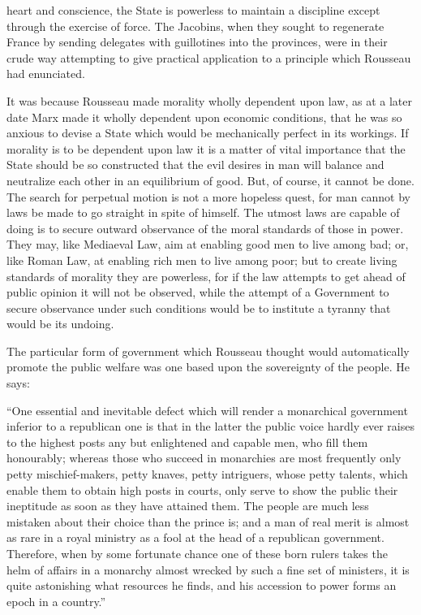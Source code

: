 \documentclass{book}
\begin{document}
heart and conscience, the State is powerless to maintain a discipline except through the exercise of force. The Jacobins, when they sought to regenerate France by sending delegates with guillotines into the provinces, were in their crude way attempting to give practical application to a principle which Rousseau had enunciated.

It was because Rousseau made morality wholly dependent upon law, as at a later date Marx made it wholly dependent upon economic conditions, that he was so anxious to devise a State which would be mechanically perfect in its workings. If morality is to be dependent upon law it is a matter of vital importance that the State should be so constructed that the evil desires in man will balance and neutralize each other in an equilibrium of good. But, of course, it cannot be done. The search for perpetual motion is not a more hopeless quest, for man cannot by laws be made to go straight in spite of himself. The utmost laws are capable of doing is to secure outward observance of the moral standards of those in power. They may, like Mediaeval Law, aim at enabling good men to live among bad; or, like Roman Law, at enabling rich men to live among poor; but to create living standards of morality they are powerless, for if the law attempts to get ahead of public opinion it will not be observed, while the attempt of a Government to secure observance under such conditions would be to institute a tyranny that would be its undoing.

The particular form of government which Rousseau thought would automatically promote the public welfare was one based upon the sovereignty of the people. He says:

“One essential and inevitable defect which will render a monarchical government inferior to a republican one is that in the latter the public voice hardly ever raises to the highest posts any but enlightened and capable men, who fill them honourably; whereas those who succeed in monarchies are most frequently only petty mischief-makers, petty knaves, petty intriguers, whose petty talents, which enable them to obtain high posts in courts, only serve to show the public their ineptitude as soon as they have attained them. The people are much less mistaken about their choice than the prince is; and a man of real merit is almost as rare in a royal ministry as a fool at the head of a republican government. Therefore, when by some fortunate chance one of these born rulers takes the helm of affairs in a monarchy almost wrecked by such a fine set of ministers, it is quite astonishing what resources he finds, and his accession to power forms an epoch in a country.”
\end{document}
